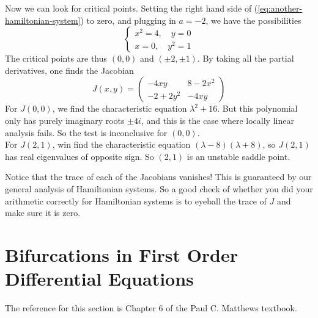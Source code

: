 \documentclass[11pt, letterpaper, oneside]{article}     %
\numberwithin{equation}{subsection}
\theoremstyle{definition}
\numberwithin{theorem}{section}
\theoremstyle{remark}
\begin{document}
\begin{enumerate}
  Now we can look for critical points. Setting the right hand side of (\ref{eq:another-hamiltonian-system}) to zero, and plugging in $a = -2$, we have the possibilities
  \begin{equation}
    \begin{cases}
      x^2 = 4,\quad y = 0\\
      x = 0,\quad y^2 = 1
    \end{cases}
  \end{equation}
  The critical points are thus $(0,0)$ and $(\pm 2,\pm 1)$. By taking all the partial derivatives, one finds the Jacobian
  \begin{equation}
    J(x,y) =
    \begin{pmatrix}
      -4xy & 8 - 2x^2\\
      -2+2y^2 & -4xy
    \end{pmatrix}
  \end{equation}
  For $J(0,0)$, we find the characteristic equation $\lambda^2 + 16$. But this polynomial only has purely imaginary roots $\pm 4i$, and this is the case where locally linear analysis fails. So the test is inconclusive for $(0,0)$.\\
  For $J(2,1)$, win find the characteristic equation $(\lambda-8)(\lambda+8)$, so $J(2,1)$ has real eigenvalues of opposite sign. So $(2,1)$ is an unstable saddle point.

  Notice that the trace of each of the Jacobians vanishes! This is guaranteed by our general analysis of Hamiltonian systems. So a good check of whether you did your arithmetic correctly for Hamiltonian systems is to eyeball the trace of $J$ and make sure it is zero.

\end{enumerate}

\section{Bifurcations in First Order Differential Equations}

The reference for this section is Chapter 6 of the Paul C. Matthews textbook.
\end{document}
